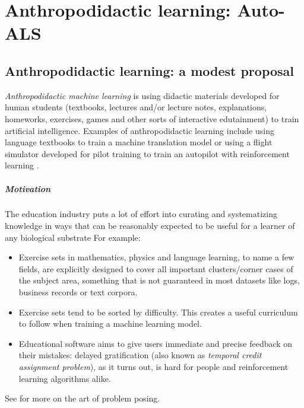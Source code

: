 \chapter{Anthropodidactic learning: Auto-ALS}
\label{ch:auto-als}

\section{Anthropodidactic learning: a modest proposal}
\label{sec:anthropodidactic}

\emph{Anthropodidactic machine learning} is using didactic materials developed for human students (textbooks, lectures and/or lecture notes, explanations, homeworks, exercises, games and other sorts of interactive edutainment) to train artificial intelligence.
Examples of anthropodidactic learning include using language textbooks to train a machine translation model or using a flight simulator developed for pilot training to train an autopilot with reinforcement learning \cite{staudingerXPlaneMLEnvironmentLearning2018}.

\paragraph{Motivation}

The education industry puts a lot of effort into curating and systematizing knowledge in ways that can be reasonably expected to be useful for a learner of any biological substrate
For example: 
\begin{itemize}
    \item Exercise sets in mathematics, physics and language learning, to name a few fields, are explicitly designed to cover all important clusters/corner cases of the subject area, something that is not guaranteed in most datasets like logs, business records or text corpora.
    \item Exercise sets tend to be sorted by difficulty. This creates a useful curriculum to follow when training a machine learning model.
    \item Educational software aims to give users immediate and precise feedback on their mistakes: delayed gratification (also known as \emph{temporal credit assignment problem}), as it turns out, is hard for people \cite{tobinDelayGratificationReview2010} and reinforcement learning algorithms alike.
\end{itemize}

See \cite{brownArtProblemPosing2005} for more on the art of problem posing.

